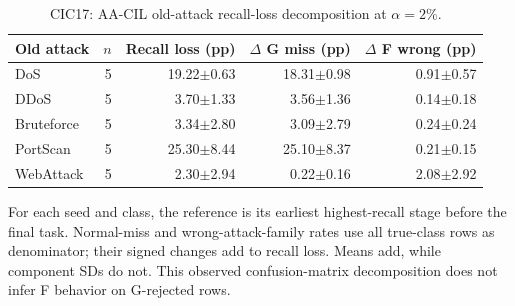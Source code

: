 \begin{table}[t]
\centering\scriptsize
\setlength{\tabcolsep}{3.3pt}
\caption{CIC17: AA-CIL old-attack recall-loss decomposition at $\alpha=2\%$.}\label{tab:forgetting-decomposition-cic_ids_2017}
\begin{tabular}{lrrrr}
\toprule
Old attack & $n$ & Recall loss (pp) & $\Delta$ G miss (pp) & $\Delta$ F wrong (pp) \\
\midrule
DoS & 5 & 19.22$\pm$0.63 & 18.31$\pm$0.98 & 0.91$\pm$0.57 \\
DDoS & 5 & 3.70$\pm$1.33 & 3.56$\pm$1.36 & 0.14$\pm$0.18 \\
Bruteforce & 5 & 3.34$\pm$2.80 & 3.09$\pm$2.79 & 0.24$\pm$0.24 \\
PortScan & 5 & 25.30$\pm$8.44 & 25.10$\pm$8.37 & 0.21$\pm$0.15 \\
WebAttack & 5 & 2.30$\pm$2.94 & 0.22$\pm$0.16 & 2.08$\pm$2.92 \\
\bottomrule
\end{tabular}
\par\smallskip\begin{minipage}{0.98\textwidth}\scriptsize For each seed and class, the reference is its earliest highest-recall stage before the final task. Normal-miss and wrong-attack-family rates use all true-class rows as denominator; their signed changes add to recall loss. Means add, while component SDs do not. This observed confusion-matrix decomposition does not infer F behavior on G-rejected rows.\end{minipage}
\end{table}

